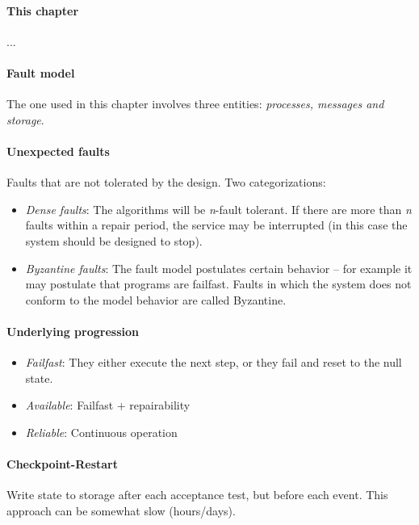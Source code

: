 
\paragraph{This chapter} ...

\sepline

\paragraph{Fault model} The one used in this chapter involves three entities: \textit{processes, messages and storage}.

\paragraph{Unexpected faults} Faults that are not tolerated by the design. Two categorizations:
\begin{itemize}[nolistsep,noitemsep]
  \item \textit{Dense faults}: The algorithms will be \textit{n}-fault tolerant. If there are more than \textit{n} faults within a repair period, the service may be interrupted (in this case the system should be designed to stop).
  \item \textit{Byzantine faults}: The fault model postulates certain behavior -- for example it may postulate that programs are failfast. Faults in which the system does not conform to the model behavior are called Byzantine.
\end{itemize}

\paragraph{Underlying progression}
\begin{itemize}
  \item \textit{Failfast}: They either execute the next step, or they fail and reset to the null state.
  \item \textit{Available}: Failfast + repairability
  \item \textit{Reliable}: Continuous operation
\end{itemize}

\paragraph{Checkpoint-Restart} Write state to storage after each acceptance test, but before each event. This approach can be somewhat slow (hours/days).

